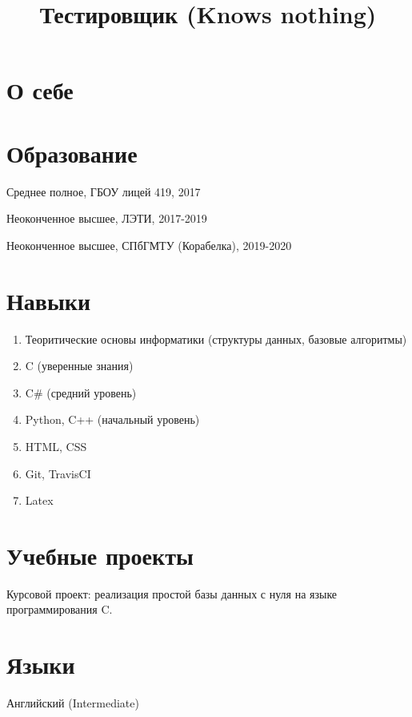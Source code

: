\documentclass[11pt,a4paper]{moderncv}
\title{Тестировщик (Knows nothing)}
\begin{document}
\maketitle

\section{О себе} %
\section{Образование}
Среднее полное, ГБОУ лицей 419, 2017

Неоконченное высшее, ЛЭТИ, 2017-2019

Неоконченное высшее, СПбГМТУ (Корабелка), 2019-2020


\section{Навыки}
\begin{enumerate}
    \item Теоритические основы информатики (структуры данных, базовые алгоритмы)
    \item C (уверенные знания)
    \item C\# (средний уровень)
    \item Python, C++ (начальный уровень)
    \item HTML, CSS
    \item Git, TravisCI
    \item Latex
\end{enumerate}

\section{Учебные проекты}
Курсовой проект: реализация простой базы данных с нуля на языке программирования C.
\section{Языки}
Английский (Intermediate)
 
\end{document}
